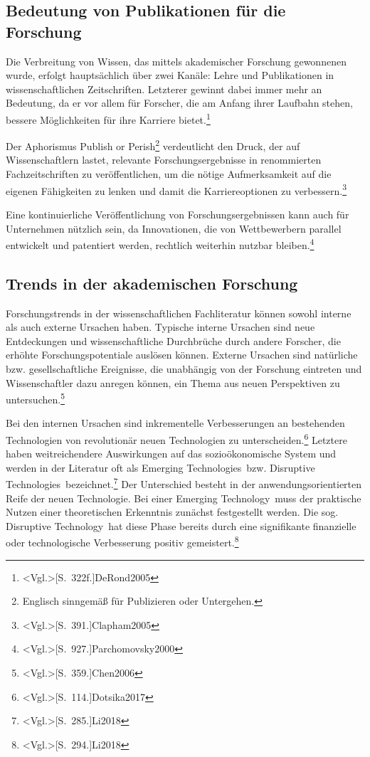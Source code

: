 \subsection{Bedeutung von Publikationen für die Forschung}
Die Verbreitung von Wissen, das mittels akademischer Forschung gewonnenen wurde, erfolgt hauptsächlich über zwei Kanäle: Lehre und Publikationen in wissenschaftlichen Zeitschriften. Letzterer gewinnt dabei immer mehr an Bedeutung, da er vor allem für Forscher, die am Anfang ihrer Laufbahn stehen, bessere Möglichkeiten für ihre Karriere bietet.\footnote{\citeNP<Vgl.>[S.~322f.]{DeRond2005}}

Der Aphorismus \glqq Publish or Perish\grqq\footnote{Englisch sinngemäß für \glqq Publizieren oder Untergehen\grqq.} verdeutlicht den Druck, der auf Wissenschaftlern lastet, relevante Forschungsergebnisse in renommierten Fachzeitschriften zu veröffentlichen, um die nötige Aufmerksamkeit auf die eigenen Fähigkeiten zu lenken und damit die Karriereoptionen zu verbessern.\footnote{\citeNP<Vgl.>[S.~391.]{Clapham2005}}

Eine kontinuierliche Veröffentlichung von Forschungsergebnissen kann auch für Unternehmen nützlich sein, da Innovationen, die von Wettbewerbern parallel entwickelt und patentiert werden, rechtlich weiterhin nutzbar bleiben.\footnote{\citeNP<Vgl.>[S.~927.]{Parchomovsky2000}}

\subsection{Trends in der akademischen Forschung}
Forschungstrends in der wissenschaftlichen Fachliteratur können sowohl interne als auch externe Ursachen haben. Typische interne Ursachen sind neue Entdeckungen und wissenschaftliche Durchbrüche durch andere Forscher, die erhöhte Forschungspotentiale auslösen können. Externe Ursachen sind natürliche bzw. gesellschaftliche Ereignisse, die unabhängig von der Forschung eintreten und Wissenschaftler dazu anregen können, ein Thema aus neuen Perspektiven zu untersuchen.\footnote{\citeNP<Vgl.>[S.~359.]{Chen2006}}

Bei den internen Ursachen sind inkrementelle Verbesserungen an bestehenden Technologien von revolutionär neuen Technologien zu unterscheiden.\footnote{\citeNP<Vgl.>[S.~114.]{Dotsika2017}} Letztere haben weitreichendere Auswirkungen auf das sozioökonomische System und werden in der Literatur oft als \glqq Emerging Technologies\grqq~bzw. \glqq Disruptive Technologies\grqq~bezeichnet.\footnote{\citeNP<Vgl.>[S.~285.]{Li2018}} Der Unterschied besteht in der anwendungsorientierten Reife der neuen Technologie. Bei einer \glqq Emerging Technology\grqq~muss der praktische Nutzen einer theoretischen Erkenntnis zunächst festgestellt werden. Die sog. \glqq Disruptive Technology\grqq~hat diese Phase bereits durch eine signifikante finanzielle oder technologische Verbesserung positiv gemeistert.\footnote{\citeNP<Vgl.>[S.~294.]{Li2018}}

